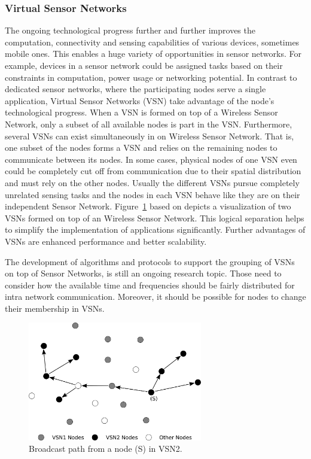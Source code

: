 \documentclass[12pt,journal]{IEEEtran}
\begin{document}
\subsubsection{Virtual Sensor Networks}
The ongoing technological progress further and further improves the computation, connectivity and sensing capabilities of various devices, sometimes mobile ones. \cite{Jayasumana} This enables a huge variety of opportunities in sensor networks. For example, devices in a sensor network could be assigned tasks based on their constraints in computation, power usage or networking potential. In contrast to dedicated sensor networks, where the participating nodes serve a single application, Virtual Sensor Networks (VSN) take advantage of the node’s technological progress. When a VSN is formed on top of a Wireless Sensor Network, only a subset of all available nodes is part in the VSN. Furthermore, several VSNs can exist simultaneously in on Wireless Sensor Network. \cite{Jayasumana} That is, one subset of the nodes forms a VSN and relies on the remaining nodes to communicate between its nodes. In some cases, physical nodes of one VSN even could be completely cut off from communication due to their spatial distribution and must rely on the other nodes. Usually the different VSNs pursue completely unrelated sensing tasks and the nodes in each VSN behave like they are on their independent Sensor Network. Figure~\ref{vsnfig} based on \cite{Jayasumana} depicts a visualization of two VSNs formed on top of an Wireless Sensor Network. This logical separation helps to simplify the implementation of applications significantly. \cite{Jayasumana} Further advantages of VSNs are enhanced performance and better scalability.

The development of algorithms and protocols to support the grouping of VSNs on top of Sensor Networks, is still an ongoing research topic. Those need to consider how the available time and frequencies should be fairly distributed for intra network communication. Moreover, it should be possible for nodes to change their membership in VSNs.

\begin{figure}
 \centering
 \includegraphics[width=3in]{figs/VirtualSensorNetwork.pdf}
 \caption{Broadcast path from a node (S) in VSN2.}
 \label{vsnfig}
\end{figure}
\end{document}
